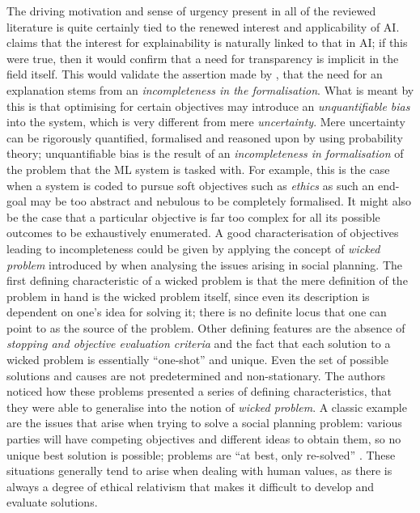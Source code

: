 The driving motivation and sense of urgency present in all of the reviewed literature is quite certainly tied to the renewed interest and applicability of AI.
\citet{Preece2018} claims that the interest for explainability is naturally linked to that in AI; if this were true, then it would confirm that a need for transparency is implicit in the field itself.
This would validate the assertion made by \citet{doshi2017towards}, that the need for an explanation stems from an \textit{incompleteness in the formalisation}.
What is meant by this is that optimising for certain objectives may introduce an \textit{unquantifiable bias} into the system, which is very different from mere \textit{uncertainty}.
Mere uncertainty can be rigorously quantified, formalised and reasoned upon by using probability theory; unquantifiable bias is the result of an \textit{incompleteness in formalisation} of the problem that the ML system is tasked with.
For example, this is the case when a system is coded to pursue soft objectives such as \textit{ethics} as such an end-goal may be too abstract and nebulous to be completely formalised.
It might also be the case that a particular objective is far too complex for all its possible outcomes to be exhaustively enumerated.
A good characterisation of objectives leading to incompleteness could be given by applying the concept of \textit{wicked problem} introduced by \citet{Rittel1973} when analysing the issues arising in social planning.
The first defining characteristic of a wicked problem is that the mere definition of the problem in hand is the wicked problem itself, since even its description is dependent on one's idea for solving it; there is no definite locus that one can point to as the source of the problem. 
Other defining features are the absence of \textit{stopping and objective evaluation criteria} and the fact that each solution to a wicked problem is essentially \enquote{one-shot} and unique.  
Even the set of possible solutions and causes are not predetermined and non-stationary. 
The authors noticed how these problems presented a series of defining characteristics, that they were able to generalise into the notion of \textit{wicked problem}.
A classic example are the issues that arise when trying to solve a social planning problem: various parties will have competing objectives and different ideas to obtain them, so no unique best solution is possible; problems are \enquote{at best, only re-solved} \citep{Rittel1973}. 
These situations generally tend to arise when dealing with human values, as there is always a degree of ethical relativism that makes it difficult to develop and evaluate solutions.  
